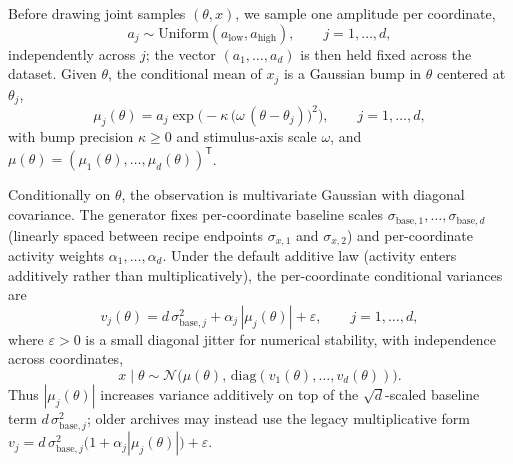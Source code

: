 Before drawing joint samples $(\theta,x)$, we sample one amplitude per coordinate,
\begin{equation}
  a_j \sim \mathrm{Uniform}(a_{\mathrm{low}}, a_{\mathrm{high}}),
  \qquad j = 1,\ldots,d,
\end{equation}
independently across $j$; the vector $(a_1,\ldots,a_d)$ is then held fixed across the dataset.
Given $\theta$, the conditional mean of $x_j$ is a Gaussian bump in $\theta$ centered at $\theta_j$,
\begin{equation}
  \mu_j(\theta) = a_j \exp\!\bigl(-\kappa\,\bigl(\omega\,(\theta - \theta_j)\bigr)^2\bigr),
  \qquad j = 1,\ldots,d,
\end{equation}
with bump precision $\kappa\ge 0$ and stimulus-axis scale $\omega$, and $\mu(\theta)=(\mu_1(\theta),\ldots,\mu_d(\theta))^{\mathsf{T}}$.

Conditionally on $\theta$, the observation is multivariate Gaussian with diagonal covariance.
The generator fixes per-coordinate baseline scales $\sigma_{\mathrm{base},1},\ldots,\sigma_{\mathrm{base},d}$ (linearly spaced between recipe endpoints $\sigma_{x,1}$ and $\sigma_{x,2}$) and per-coordinate activity weights $\alpha_1,\ldots,\alpha_d$.
Under the default additive law (activity enters additively rather than multiplicatively), the per-coordinate conditional variances are
\begin{equation}
  \label{eq:sqrtd-additive-var}
  v_j(\theta) = d\,\sigma_{\mathrm{base},j}^{2} + \alpha_j\,|\mu_j(\theta)| + \varepsilon,
  \qquad j = 1,\ldots,d,
\end{equation}
where $\varepsilon>0$ is a small diagonal jitter for numerical stability, with independence across coordinates,
\begin{equation}
  x \mid \theta \sim \mathcal{N}\!\bigl(\mu(\theta),\,\mathrm{diag}(v_1(\theta),\ldots,v_d(\theta))\bigr).
\end{equation}
Thus $|\mu_j(\theta)|$ increases variance additively on top of the $\sqrt{d}$-scaled baseline term $d\,\sigma_{\mathrm{base},j}^{2}$; older archives may instead use the legacy multiplicative form $v_j = d\,\sigma_{\mathrm{base},j}^{2}\bigl(1+\alpha_j|\mu_j(\theta)|\bigr)+\varepsilon$.

